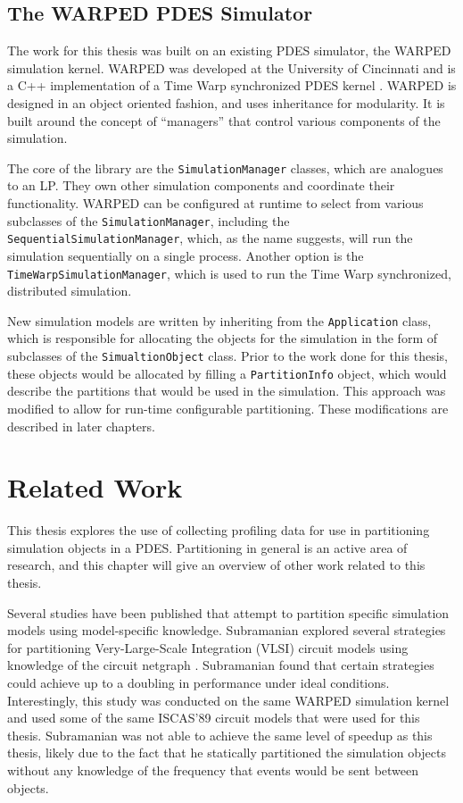 \documentclass[11pt]{book}
\begin{document}
\section{The WARPED PDES Simulator}

The work for this thesis was built on an existing PDES simulator, the WARPED simulation kernel. WARPED was developed at the University of Cincinnati and is a C++ implementation of a Time Warp synchronized PDES kernel \cite{king-11}.  WARPED is designed in an object oriented fashion, and uses inheritance for modularity. It is built around the concept of ``managers'' that control various components of the simulation. 

The core of the library are the \texttt{SimulationManager} classes, which are analogues to an LP. They own other simulation components and coordinate their functionality. WARPED can be configured at runtime to select from various subclasses of the \texttt{SimulationManager}, including the \texttt{SequentialSimulationManager}, which, as the name suggests, will run the simulation sequentially on a single process. Another option is the \texttt{TimeWarpSimulationManager}, which is used to run the Time Warp synchronized, distributed simulation. 

New simulation models are written by inheriting from the \texttt{Application} class, which is responsible for allocating the objects for the simulation in the form of subclasses of the \texttt{SimualtionObject} class. Prior to the work done for this thesis, these objects would be allocated by filling a \texttt{PartitionInfo} object, which would describe the partitions that would be used in the simulation. This approach was modified to allow for run-time configurable partitioning. These modifications are described in later chapters.

\chapter{Related Work}\label{relatedWork}

This thesis explores the use of collecting profiling data for use in partitioning simulation objects in a PDES. Partitioning in general is an active area of research, and this chapter will give an overview of other work related to this thesis.

Several studies have been published that attempt to partition specific simulation models using model-specific knowledge. Subramanian explored several strategies for partitioning Very-Large-Scale Integration (VLSI) circuit models using knowledge of the circuit netgraph \cite{subramanian-01}. Subramanian found that certain strategies could achieve up to a doubling in performance under ideal conditions. Interestingly, this study was conducted on the same WARPED simulation kernel and used some of the same ISCAS'89 circuit models that were used for this thesis. Subramanian was not able to achieve the same level of speedup as this thesis, likely due to the fact that he statically partitioned the simulation objects without any knowledge of the frequency that events would be sent between objects. 
\end{document}
